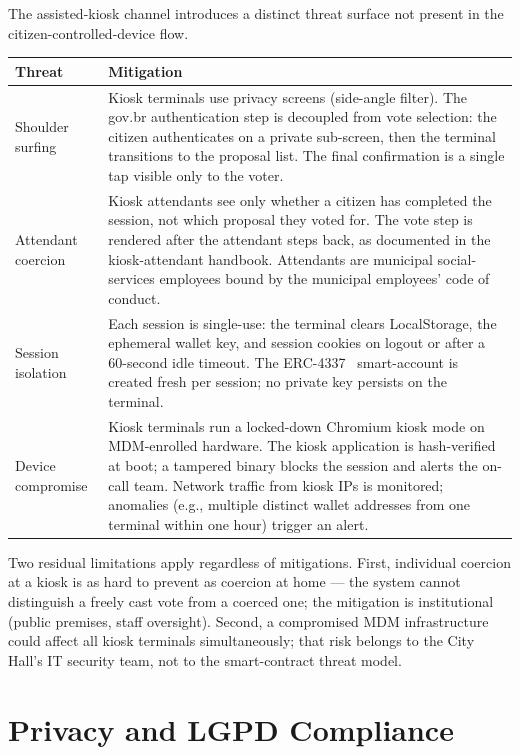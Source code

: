\documentclass[12pt]{article}
\begin{document}
The assisted-kiosk channel introduces a distinct threat surface not present
in the citizen-controlled-device flow.

\noindent\begin{tabular}{p{} p{}}
\toprule
\textbf{Threat} & \textbf{Mitigation} \\
\midrule
Shoulder surfing &
  Kiosk terminals use privacy screens (side-angle filter). The gov.br
  authentication step is decoupled from vote selection: the citizen
  authenticates on a private sub-screen, then the terminal transitions to
  the proposal list. The final confirmation is a single tap visible only to
  the voter. \\
\midrule
Attendant coercion &
  Kiosk attendants see only whether a citizen has completed the session, not
  which proposal they voted for. The vote step is rendered after the
  attendant steps back, as documented in the kiosk-attendant handbook.
  Attendants are municipal social-services employees bound by the municipal
  employees' code of conduct. \\
\midrule
Session isolation &
  Each session is single-use: the terminal clears LocalStorage, the ephemeral
  wallet key, and session cookies on logout or after a 60-second idle timeout.
  The ERC-4337~\cite{eip4337} smart-account is created fresh per session; no
  private key persists on the terminal. \\
\midrule
Device compromise &
  Kiosk terminals run a locked-down Chromium kiosk mode on MDM-enrolled
  hardware. The kiosk application is hash-verified at boot; a tampered binary
  blocks the session and alerts the on-call team. Network traffic from kiosk
  IPs is monitored; anomalies (e.g., multiple distinct wallet addresses from
  one terminal within one hour) trigger an alert. \\
\bottomrule
\end{tabular}

\medskip
Two residual limitations apply regardless of mitigations. First, individual
coercion at a kiosk is as hard to prevent as coercion at home --- the
system cannot distinguish a freely cast vote from a coerced one; the
mitigation is institutional (public premises, staff oversight). Second, a
compromised MDM infrastructure could affect all kiosk terminals
simultaneously; that risk belongs to the City Hall's IT security team,
not to the smart-contract threat model.

\section{Privacy and LGPD Compliance}
\label{sec:privacy}
\end{document}
